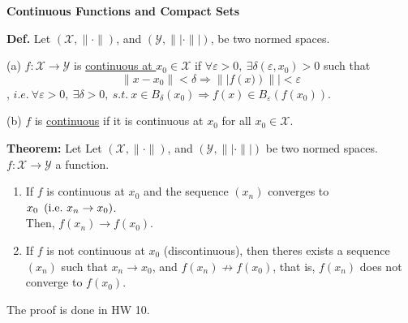 \documentclass[letterpaper]{article}
\begin{document}
\begin{center}
    \textbf{Continuous Functions and Compact Sets}
\end{center}

\noindent \textbf{Def.} Let $\left(\mathcal{X},\| \cdot \|\right)$, and $\left(\mathcal{Y},\|| \cdot \||\right)$, be two normed spaces.

(a) $f:\mathcal{X} \rightarrow \mathcal{Y}$ is \underline{continuous at $x_0 \in \mathcal{X}$} if $\forall \varepsilon > 0,~ \exists  \delta \left(\varepsilon, x_0\right) > 0$ such that
    $$ \|x-x_0\| < \delta \Rightarrow\|| f\left(x)\right) \|| < \varepsilon$$,
    $i.e. \ \forall \varepsilon>0,~\exists \delta > 0, ~ s.t. \ x \in B_{\delta}\left(x_0\right) \Rightarrow f\left(x\right) \in B_{\varepsilon}\left(f\left( x_0\right)\right)$.

    (b) $f$ is \underline{continuous} if it is continuous at $x_0$ for all $x_0 \in \mathcal{X}$.

\noindent \textbf{Theorem:} Let  Let $\left(\mathcal{X},\| \cdot \|\right)$, and $\left(\mathcal{Y},\|| \cdot \||\right)$ be two normed spaces. $f:\mathcal{X} \rightarrow \mathcal{Y}$ a function.
    \begin{enumerate}[label=(\alph*)]
        \vspace{-5mm}
        \item If $f$ is continuous at $x_0$ and the sequence $\left(x_n\right)$ converges to $x_0 ~ \left(\textnormal{i.e.}\ x_n \rightarrow x_0\right)$.\\
            Then, $f\left(x_n\right) \rightarrow f\left(x_0\right)$.
        \item If $f$ is not continuous at $x_0$ (discontinuous), then theres exists a sequence $\left(x_n\right)$ such that $ x_n \rightarrow x_0$, and $f\left(x_n\right) \nrightarrow f\left(x_0\right)$, that is, $f\left(x_n\right)$ does not converge to $f\left(x_0\right)$.
    \end{enumerate}

The proof is done in HW 10.
\end{document}
